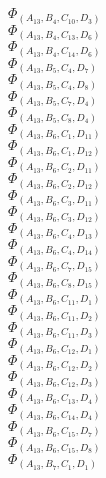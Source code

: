 \documentclass[14pt]{article}
\begin{document}
    $\Phi_{({A}_{13}, {B}_{4}, {C}_{10}, {D}_{3})}$ \\ 
    $\Phi_{({A}_{13}, {B}_{4}, {C}_{13}, {D}_{6})}$ \\ 
    $\Phi_{({A}_{13}, {B}_{4}, {C}_{14}, {D}_{6})}$ \\ 
    $\Phi_{({A}_{13}, {B}_{5}, {C}_{4}, {D}_{7})}$ \\ 
    $\Phi_{({A}_{13}, {B}_{5}, {C}_{4}, {D}_{8})}$ \\ 
    $\Phi_{({A}_{13}, {B}_{5}, {C}_{7}, {D}_{4})}$ \\ 
    $\Phi_{({A}_{13}, {B}_{5}, {C}_{8}, {D}_{4})}$ \\ 
    $\Phi_{({A}_{13}, {B}_{6}, {C}_{1}, {D}_{11})}$ \\ 
    $\Phi_{({A}_{13}, {B}_{6}, {C}_{1}, {D}_{12})}$ \\ 
    $\Phi_{({A}_{13}, {B}_{6}, {C}_{2}, {D}_{11})}$ \\ 
    $\Phi_{({A}_{13}, {B}_{6}, {C}_{2}, {D}_{12})}$ \\ 
    $\Phi_{({A}_{13}, {B}_{6}, {C}_{3}, {D}_{11})}$ \\ 
    $\Phi_{({A}_{13}, {B}_{6}, {C}_{3}, {D}_{12})}$ \\ 
    $\Phi_{({A}_{13}, {B}_{6}, {C}_{4}, {D}_{13})}$ \\ 
    $\Phi_{({A}_{13}, {B}_{6}, {C}_{4}, {D}_{14})}$ \\ 
    $\Phi_{({A}_{13}, {B}_{6}, {C}_{7}, {D}_{15})}$ \\ 
    $\Phi_{({A}_{13}, {B}_{6}, {C}_{8}, {D}_{15})}$ \\ 
    $\Phi_{({A}_{13}, {B}_{6}, {C}_{11}, {D}_{1})}$ \\ 
    $\Phi_{({A}_{13}, {B}_{6}, {C}_{11}, {D}_{2})}$ \\ 
    $\Phi_{({A}_{13}, {B}_{6}, {C}_{11}, {D}_{3})}$ \\ 
    $\Phi_{({A}_{13}, {B}_{6}, {C}_{12}, {D}_{1})}$ \\ 
    $\Phi_{({A}_{13}, {B}_{6}, {C}_{12}, {D}_{2})}$ \\ 
    $\Phi_{({A}_{13}, {B}_{6}, {C}_{12}, {D}_{3})}$ \\ 
    $\Phi_{({A}_{13}, {B}_{6}, {C}_{13}, {D}_{4})}$ \\ 
    $\Phi_{({A}_{13}, {B}_{6}, {C}_{14}, {D}_{4})}$ \\ 
    $\Phi_{({A}_{13}, {B}_{6}, {C}_{15}, {D}_{7})}$ \\ 
    $\Phi_{({A}_{13}, {B}_{6}, {C}_{15}, {D}_{8})}$ \\ 
    $\Phi_{({A}_{13}, {B}_{7}, {C}_{1}, {D}_{1})}$ \\ 
\end{document}
